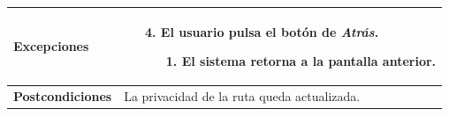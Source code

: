 \begin{longtable}{| p{4cm} | p{10cm} |}
\hline
\textbf{Excepciones} &\mbox{}\par\vspace{-\baselineskip}
\begin{enumerate}[leftmargin=0.9cm, topsep=0.1cm]
\item[4.] El usuario pulsa el botón de \textit{Atrás}.
	\begin{itemize}
	\item[1.] El sistema retorna a la pantalla anterior.
	\end{itemize}
\end{enumerate}
\\

\hline
\textbf{Postcondiciones} & 
La privacidad de la ruta queda actualizada.\\
\hline
\end{longtable}



\newpage
